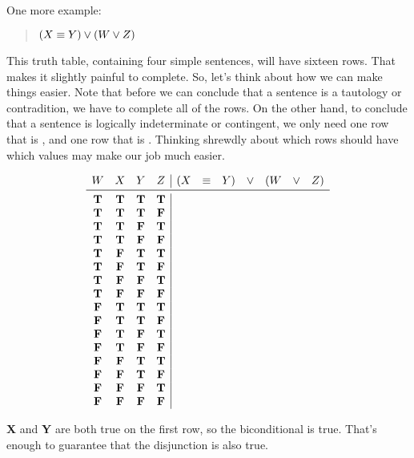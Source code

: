 \documentclass[../logic-text.tex]{subfiles}
\begin{document}
One more example:

\begin{quote}
  \((X \equiv Y) \lor (W \lor Z)\)
\end{quote}

This truth table, containing four simple sentences, will have sixteen rows.
That makes it slightly painful to complete.
So, let's think about how we can make things easier.
Note that before we can conclude that a sentence is a tautology or contradition, we have to complete all of the rows.
On the other hand, to conclude that a sentence is logically indeterminate or contingent, we only need one row that is \true, and one row that is \false.
Thinking shrewdly about which rows should have which values may make our job much easier.

\[
\begin{array}{cccc|ccccccc}
  W & X & Y & Z & (X & \liff &  Y) & \lor & (W & \lor & Z)\\ \midrule
  \true & \true & \true & \true &&&&&&& \\
    \true & \true & \true & \false &&&&&&& \\
  \true & \true & \false & \true &&&&&&& \\
  \true & \true & \false & \false &&&&&&& \\
  \true & \false & \true & \true &&&&&&& \\
  \true & \false & \true & \false &&&&&&& \\
  \true & \false & \false & \true &&&&&&& \\
  \true & \false & \false & \false &&&&&&& \\
  \false & \true & \true & \true &&&&&&& \\
  \false & \true & \true & \false &&&&&&& \\
  \false & \true & \false & \true &&&&&&& \\
  \false & \true & \false & \false &&&&&&& \\
  \false & \false & \true & \true &&&&&&& \\
  \false & \false & \true & \false &&&&&&& \\
  \false & \false & \false & \true &&&&&&& \\
  \false & \false & \false & \false &&&&&&& \\
\end{array}
\]

\textbf{X} and \textbf{Y} are both true on the first row, so the biconditional is true.
That's enough to guarantee that the disjunction is also true.
\end{document}
